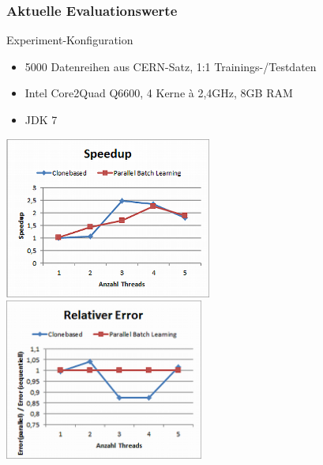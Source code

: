 \documentclass[18pt]{beamer}
\begin{document}
	\begin{frame}[c]\frametitle{Aktuelle Evaluationswerte}
		\begin{block}{Experiment-Konfiguration}
			\begin{itemize}
				\item 5000 Datenreihen aus CERN-Satz, 1:1 Trainings-/Testdaten
				\item Intel Core2Quad Q6600, 4 Kerne à 2,4GHz, 8GB RAM
				\item JDK 7
			\end{itemize}
		\end{block}
		\includegraphics[width=0.51\textwidth]{images/eval_speedup.png}
		\includegraphics[width=0.49\textwidth]{images/eval_error.png}
	\end{frame}
\backupend
\end{document}
